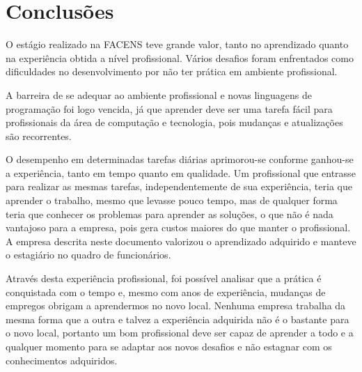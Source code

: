 \documentclass[
	12pt,				%
	oneside,			%
	a4paper,			%
	chapter=TITLE,		%
	section=TITLE,		%
	sumario=tradicional %
	english,			%
	french,				%
	spanish,			%
	brazil				%
	]{abntex2}
\begin{document}
\chapter{Conclusões}
\label{chap:chap6}
O estágio realizado na FACENS teve grande valor, tanto no aprendizado quanto na experiência obtida a nível profissional. Vários desafios foram enfrentados como dificuldades no desenvolvimento por não ter prática em ambiente profissional. 

A barreira de se adequar ao ambiente profissional e novas linguagens de programação foi logo vencida, já que aprender deve ser uma tarefa fácil para profissionais da área de computação e tecnologia, pois mudanças e atualizações são recorrentes.

O desempenho em determinadas tarefas diárias aprimorou-se conforme ganhou-se a experiência, tanto em tempo quanto em qualidade.  Um profissional que entrasse para realizar as mesmas tarefas, independentemente de sua experiência, teria que aprender o trabalho, mesmo que levasse pouco tempo, mas de qualquer forma teria que conhecer os problemas para aprender as soluções, o que não é nada vantajoso para a empresa, pois gera custos maiores do que manter o profissional. A empresa descrita neste documento valorizou o aprendizado adquirido e manteve o estagiário no quadro de funcionários.

Através desta experiência profissional, foi possível analisar que a prática é conquistada com o tempo e, mesmo com anos de experiência, mudanças de empregos obrigam a aprendermos no novo local. Nenhuma empresa trabalha da mesma forma que a outra e talvez a experiência adquirida não é o bastante para o novo local, portanto um bom profissional deve ser capaz de aprender a todo e a qualquer momento para se adaptar aos novos desafios e não estagnar com os conhecimentos adquiridos.


%

\postextual

%


\printindex
\end{document}
